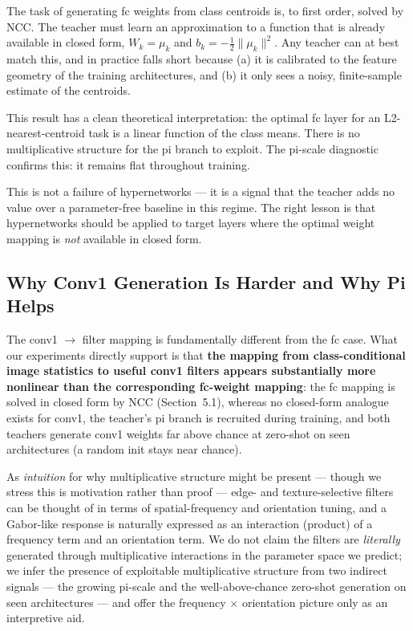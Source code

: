 \documentclass{article}
\begin{document}
The task of generating fc weights from class centroids is, to first order, solved by NCC. The teacher must learn an approximation to a function that is already available in closed form, $W_k=\mu_k$ and $b_k=-\frac{1}{2}\|\mu_k\|^2$. Any teacher can at best match this, and in practice falls short because (a) it is calibrated to the feature geometry of the training architectures, and (b) it only sees a noisy, finite-sample estimate of the centroids.

This result has a clean theoretical interpretation: the optimal fc layer for an L2-nearest-centroid task is a linear function of the class means. There is no multiplicative structure for the pi branch to exploit. The pi-scale diagnostic confirms this: it remains flat throughout training.

This is not a failure of hypernetworks --- it is a signal that the teacher adds no value over a parameter-free baseline in this regime. The right lesson is that hypernetworks should be applied to target layers where the optimal weight mapping is \emph{not} available in closed form.

\subsection{Why Conv1 Generation Is Harder and Why Pi Helps}\label{why-conv1-generation-is-harder-and-why-pi-helps}

The conv1 $\to$ filter mapping is fundamentally different from the fc case. What our experiments directly support is that \textbf{the mapping from class-conditional image statistics to useful conv1 filters appears substantially more nonlinear than the corresponding fc-weight mapping}: the fc mapping is solved in closed form by NCC (Section~5.1), whereas no closed-form analogue exists for conv1, the teacher's pi branch is recruited during training, and both teachers generate conv1 weights far above chance at zero-shot on seen architectures (a random init stays near chance).

As \emph{intuition} for why multiplicative structure might be present --- though we stress this is motivation rather than proof --- edge- and texture-selective filters can be thought of in terms of spatial-frequency and orientation tuning, and a Gabor-like response is naturally expressed as an interaction (product) of a frequency term and an orientation term. We do not claim the filters are \emph{literally} generated through multiplicative interactions in the parameter space we predict; we infer the presence of exploitable multiplicative structure from two indirect signals --- the growing pi-scale and the well-above-chance zero-shot generation on seen architectures --- and offer the frequency $\times$ orientation picture only as an interpretive aid.
\end{document}
